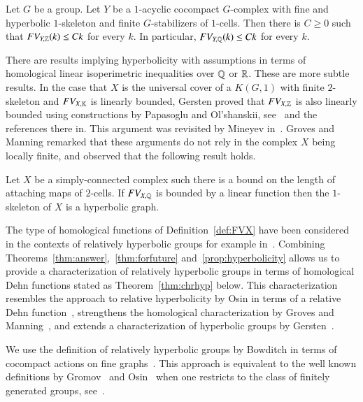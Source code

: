 \begin{theorem}  \label{thm:forfuture}
Let $G$ be a group. Let $Y$ be a $1$-acyclic cocompact $G$-complex with fine and hyperbolic $1$-skeleton and finite $G$-stabilizers of $1$-cells.  Then there is $C\geq 0$ such that  $FV_{Y, \mathbb{Z}}(k)\leq Ck$ for every $k$. In particular, $FV_{Y, \mathbb{Q}}(k) \leq Ck$ for every $k$.
\end{theorem}

There are results implying hyperbolicity with assumptions in terms of homological linear isoperimetric inequalities over $\mathbb{Q}$ or $\mathbb{R}$. These  are more subtle results.  In the case that $X$ is the universal cover of a $K(G, 1)$ with finite $2$-skeleton and $FV_{X, \mathbb{K}}$ is linearly bounded, Gersten proved that $FV_{X, \mathbb{Z}}$ is also linearly bounded using constructions by Papasoglu and Ol'shanskii, see~\cite[Theorems 5.1 and 5.7]{GerstenCohomology} and the references there in. This argument was revisited by Mineyev in~\cite[Theorem 7]{Mi02}.  Groves and Manning remarked that these arguments do not rely in the complex $X$ being locally finite, and observed that the following result holds. 

\begin{theorem}\label{prop:hyperbolicity}\cite[Theorem 2.30]{GrMa09}
Let $X$ be a simply-connected complex such  there is a  bound on the  length of attaching maps of $2$-cells.
If $FV_{X, \mathbb{Q}}$ is bounded by a linear function  then the $1$-skeleton of $X$ is a hyperbolic graph. 
\end{theorem}

The type of homological functions of Definition~\ref{def:FVX} have been considered in the contexts of  relatively hyperbolic groups for example in~\cite{GrMa09, MP15, MiYa}. Combining  Theorems~\ref{thm:answer},~\ref{thm:forfuture} and~\ref{prop:hyperbolicity} allows us to provide a characterization of  relatively hyperbolic groups in terms of homological Dehn functions stated as   Theorem~\ref{thm:chrhyp} below.  This characterization  resembles the approach to relative hyperbolicity by Osin in terms of a relative Dehn function~\cite{Os06},  strengthens the homological characterization by Groves and Manning~\cite[Theorem 3.25]{GrMa09}, and  extends a characterization of hyperbolic groups by Gersten~\cite[Theorem 3.1]{Ge96}.

We use the definition of relatively hyperbolic groups by Bowditch in terms of cocompact actions on fine graphs~\cite{Bo12}. This approach is equivalent to the well known definitions by Gromov~\cite{Gr87} and Osin~\cite{Os06}  when one restricts to the class of finitely generated groups, see~\cite{HK08, Os06}. 

